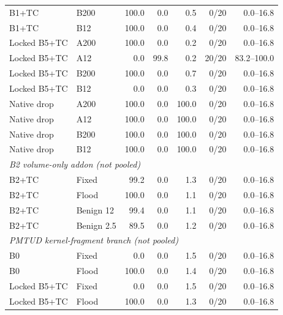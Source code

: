 \begin{table}[t]
\begin{tabular}{llrrrrr}
B1+TC & B200 & 100.0 & 0.0 & 0.5 & 0/20 & 0.0--16.8 \\
B1+TC & B12 & 100.0 & 0.0 & 0.4 & 0/20 & 0.0--16.8 \\
Locked B5+TC & A200 & 100.0 & 0.0 & 0.2 & 0/20 & 0.0--16.8 \\
Locked B5+TC & A12 & 0.0 & 99.8 & 0.2 & 20/20 & 83.2--100.0 \\
Locked B5+TC & B200 & 100.0 & 0.0 & 0.7 & 0/20 & 0.0--16.8 \\
Locked B5+TC & B12 & 0.0 & 0.0 & 0.3 & 0/20 & 0.0--16.8 \\
Native drop & A200 & 100.0 & 0.0 & 100.0 & 0/20 & 0.0--16.8 \\
Native drop & A12 & 100.0 & 0.0 & 100.0 & 0/20 & 0.0--16.8 \\
Native drop & B200 & 100.0 & 0.0 & 100.0 & 0/20 & 0.0--16.8 \\
Native drop & B12 & 100.0 & 0.0 & 100.0 & 0/20 & 0.0--16.8 \\
\hline
\multicolumn{7}{l}{\textit{B2 volume-only addon (not pooled)}} \\
\hline
B2+TC & Fixed & 99.2 & 0.0 & 1.3 & 0/20 & 0.0--16.8 \\
B2+TC & Flood & 100.0 & 0.0 & 1.1 & 0/20 & 0.0--16.8 \\
B2+TC & Benign 12 & 99.4 & 0.0 & 1.1 & 0/20 & 0.0--16.8 \\
B2+TC & Benign 2.5 & 89.5 & 0.0 & 1.2 & 0/20 & 0.0--16.8 \\
\hline
\multicolumn{7}{l}{\textit{PMTUD kernel-fragment branch (not pooled)}} \\
\hline
B0 & Fixed & 0.0 & 0.0 & 1.5 & 0/20 & 0.0--16.8 \\
B0 & Flood & 100.0 & 0.0 & 1.4 & 0/20 & 0.0--16.8 \\
Locked B5+TC & Fixed & 0.0 & 0.0 & 1.5 & 0/20 & 0.0--16.8 \\
Locked B5+TC & Flood & 100.0 & 0.0 & 1.3 & 0/20 & 0.0--16.8 \\
\hline
\end{tabular}
\endgroup
\end{table}
